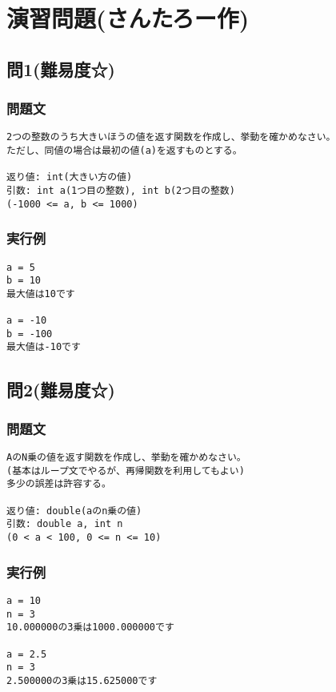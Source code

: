 \section{演習問題(さんたろー作)}
\subsection{問1(難易度☆)}
\subsubsection{問題文}
\begin{verbatim}
2つの整数のうち大きいほうの値を返す関数を作成し、挙動を確かめなさい。
ただし、同値の場合は最初の値(a)を返すものとする。

返り値: int(大きい方の値)
引数: int a(1つ目の整数), int b(2つ目の整数)
(-1000 <= a, b <= 1000)
\end{verbatim}

\subsubsection{実行例}
\begin{verbatim}
a = 5
b = 10
最大値は10です

a = -10
b = -100
最大値は-10です
\end{verbatim}

\subsection{問2(難易度☆)}
\subsubsection{問題文}
\begin{verbatim}
AのN乗の値を返す関数を作成し、挙動を確かめなさい。
(基本はループ文でやるが、再帰関数を利用してもよい)
多少の誤差は許容する。

返り値: double(aのn乗の値)
引数: double a, int n
(0 < a < 100, 0 <= n <= 10)
\end{verbatim}

\subsubsection{実行例}
\begin{verbatim}
a = 10
n = 3
10.000000の3乗は1000.000000です

a = 2.5
n = 3
2.500000の3乗は15.625000です
\end{verbatim}

